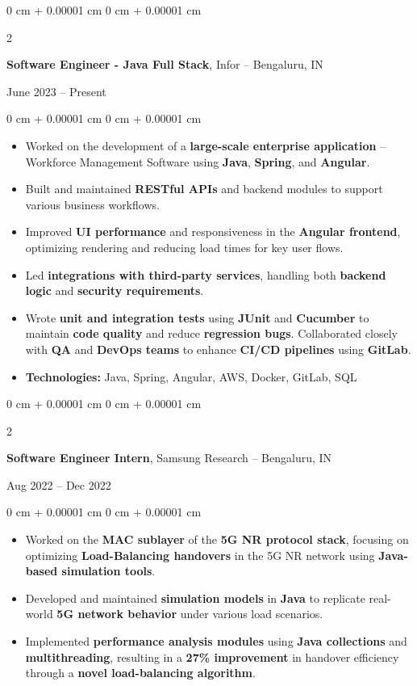 \documentclass[10pt, letterpaper]{article}
\newenvironment{highlights}{
    \begin{itemize}[
        topsep=0.10 cm,
        parsep=0.10 cm,
        partopsep=0pt,
        itemsep=0pt,
        leftmargin=0 cm + 10pt
    ]
}{
    \end{itemize}
} %
\newenvironment{onecolentry}{
    \begin{adjustwidth}{
        0 cm + 0.00001 cm
    }{
        0 cm + 0.00001 cm
    }
}{
    \end{adjustwidth}
} %
\newenvironment{twocolentry}[2][]{
    \onecolentry
    \def\secondColumn{#2}
    \setcolumnwidth{\fill, 4.5 cm}
    \begin{paracol}{2}
}{
    \switchcolumn \raggedleft \secondColumn
    \end{paracol}
    \endonecolentry
} %
\begin{document}
        
        \begin{twocolentry}{
    June 2023 – Present
}
    \textbf{Software Engineer - Java Full Stack}, Infor -- Bengaluru, IN
\end{twocolentry}

\vspace{0.10 cm}
\begin{onecolentry}
    \begin{highlights}
        \item Worked on the development of a \textbf{large-scale enterprise application} – Workforce Management Software using \textbf{Java}, \textbf{Spring}, and \textbf{Angular}.
        \item Built and maintained \textbf{RESTful APIs} and backend modules to support various business workflows.
        \item Improved \textbf{UI performance} and responsiveness in the \textbf{Angular frontend}, optimizing rendering and reducing load times for key user flows.
        \item Led \textbf{integrations with third-party services}, handling both \textbf{backend logic} and \textbf{security requirements}.
        \item Wrote \textbf{unit and integration tests} using \textbf{JUnit} and \textbf{Cucumber} to maintain \textbf{code quality} and reduce \textbf{regression bugs}. Collaborated closely with \textbf{QA} and \textbf{DevOps teams} to enhance \textbf{CI/CD pipelines} using \textbf{GitLab}.
        \item \textbf{Technologies:} Java, Spring, Angular, AWS, Docker, GitLab, SQL
    \end{highlights}
\end{onecolentry}



        \vspace{0.2 cm}

        \begin{twocolentry}{
    Aug 2022 – Dec 2022
}
    \textbf{Software Engineer Intern}, Samsung Research -- Bengaluru, IN
\end{twocolentry}

\vspace{0.10 cm}
\begin{onecolentry}
    \begin{highlights}
        \item Worked on the \textbf{MAC sublayer} of the \textbf{5G NR protocol stack}, focusing on optimizing \textbf{Load-Balancing handovers} in the 5G NR network using \textbf{Java-based simulation tools}.
        \item Developed and maintained \textbf{simulation models} in \textbf{Java} to replicate real-world \textbf{5G network behavior} under various load scenarios.
        \item Implemented \textbf{performance analysis modules} using \textbf{Java collections} and \textbf{multithreading}, resulting in a \textbf{27\% improvement} in handover efficiency through a \textbf{novel load-balancing algorithm}.
    \end{highlights}
\end{onecolentry}
\end{document}
